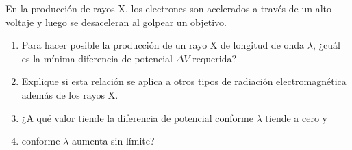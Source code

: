 \item En la producción de rayos X, los electrones son acelerados a través de un alto voltaje y luego se desaceleran al golpear un objetivo.
\begin{enumerate}
    \item Para hacer posible la producción de un rayo X de longitud de onda $\lambda$, ¿cuál es la mínima diferencia de potencial $\Delta V$ requerida?
    \item Explique si esta relación se aplica a otros tipos de radiación electromagnética además de los rayos X.
    \item ¿A qué valor tiende la diferencia de potencial conforme $\lambda$ tiende a cero y
    \item conforme $\lambda$ aumenta sin límite?
\end{enumerate}